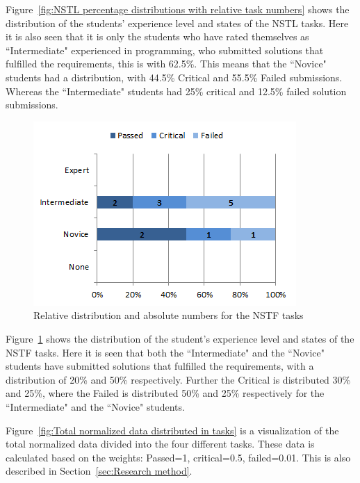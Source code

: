 \documentclass{sig-alternate-05-2015}
\begin{document}
Figure~\ref{fig:NSTL percentage distributions with relative task numbers} shows the distribution of the students' experience level and states of the NSTL tasks. Here it is also seen that it is only the students who have rated themselves as ``Inter\-mediate" experienced in programming, who submitted solutions that fulfilled the requirements, this is with 62.5\%. This means that the ``Novice" students had a distribution, with 44.5\% Critical and 55.5\% Failed submissions. Whereas the ``Inter\-mediate" students had 25\% critical and 12.5\% failed solution submissions.

\begin{figure}[!ht]
	\centering
	\includegraphics[width=1\linewidth]{img09}
	\caption{Relative distribution and absolute numbers for the NSTF tasks}
	\label{fig:NSTF percentage distributions with relative task numbers}
\end{figure}

Figure~\ref{fig:NSTF percentage distributions with relative task numbers} shows the distribution of the student's experience level and states of the NSTF tasks. Here it is seen that both the ``Intermediate" and the ``Novice" students have submitted solutions that fulfilled the requirements, with a distribution of 20\% and 50\% respectively. Further the Critical is distributed 30\% and 25\%, where the Failed is distributed 50\% and 25\% respectively for the ``Intermediate" and the ``Novice" students.

Figure~\ref{fig:Total normalized data distributed in tasks} is a visualization of the total normalized data divided into the four different tasks. These data is calculated based on the weights: Passed=1, critical=0.5, failed=0.01. This is also described in Section~\ref{sec:Research method}.
\end{document}
